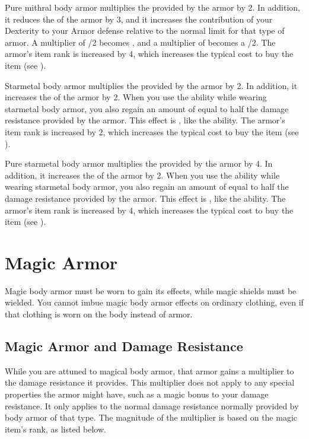          Pure mithral body armor multiplies the  provided by the armor by 2.
        In addition, it reduces the  of the armor by 3, and it increases the contribution of your Dexterity to your Armor defense relative to the normal limit for that type of armor.
        A multiplier of /2 becomes , and a multiplier of  becomes a /2.
        The armor's item rank is increased by 4, which increases the typical cost to buy the item (see ).

         Starmetal body armor multiplies the  provided by the armor by 2.
        In addition, it increases the  of the armor by 2.
        When you use the  ability while wearing starmetal body armor, you also regain an amount of  equal to half the damage resistance provided by the armor.
        This effect is , like the  ability.
        The armor's item rank is increased by 2, which increases the typical cost to buy the item (see ).

         Pure starmetal body armor multiplies the  provided by the armor by 4.
        In addition, it increases the  of the armor by 2.
        When you use the  ability while wearing starmetal body armor, you also regain an amount of  equal to half the damage resistance provided by the armor.
        This effect is , like the  ability.
        The armor's item rank is increased by 4, which increases the typical cost to buy the item (see ).

\newpage
\section{Magic Armor}
    Magic body armor must be worn to gain its effects, while magic shields must be wielded.
    You cannot imbue magic body armor effects on ordinary clothing, even if that clothing is worn on the body instead of armor.

    \subsection{Magic Armor and Damage Resistance}
        While you are attuned to magical body armor, that armor gains a multiplier to the damage resistance it provides.
        This multiplier does not apply to any special properties the armor might have, such as a magic bonus to your damage resistance.
        It only applies to the normal damage resistance normally provided by body armor of that type.
        The magnitude of the multiplier is based on the magic item's rank, as listed below.

